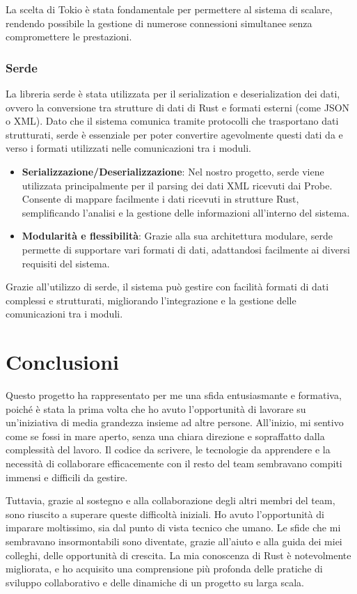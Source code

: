 \documentclass[target=bach,aauheader=,style=]{thud}
\begin{document}
La scelta di Tokio è stata fondamentale per permettere al sistema di scalare, rendendo possibile la gestione di numerose connessioni simultanee senza compromettere le prestazioni.

\subsection{Serde}
La libreria serde \cite{rust_serde} è stata utilizzata per il serialization e deserialization dei dati, ovvero la conversione tra strutture di dati di Rust e formati esterni (come JSON o XML). Dato che il sistema comunica tramite protocolli che trasportano dati strutturati, serde è essenziale per poter convertire agevolmente questi dati da e verso i formati utilizzati nelle comunicazioni tra i moduli.
\begin{itemize}
  \item \textbf{Serializzazione/Deserializzazione}: Nel nostro progetto, serde viene utilizzata principalmente per il parsing dei dati XML ricevuti dai Probe. Consente di mappare facilmente i dati ricevuti in strutture Rust, semplificando l'analisi e la gestione delle informazioni all'interno del sistema.
  \item \textbf{Modularità e flessibilità}: Grazie alla sua architettura modulare, serde permette di supportare vari formati di dati, adattandosi facilmente ai diversi requisiti del sistema.
\end{itemize}

Grazie all'utilizzo di serde, il sistema può gestire con facilità formati di dati complessi e strutturati, migliorando l'integrazione e la gestione delle comunicazioni tra i moduli.



\chapter{Conclusioni}
Questo progetto ha rappresentato per me una sfida entusiasmante e formativa, poiché è stata la prima volta che ho avuto l'opportunità di lavorare su un'iniziativa di media grandezza insieme ad altre persone. All'inizio, mi sentivo come se fossi in mare aperto, senza una chiara direzione e sopraffatto dalla complessità del lavoro. Il codice da scrivere, le tecnologie da apprendere e la necessità di collaborare efficacemente con il resto del team sembravano compiti immensi e difficili da gestire.

Tuttavia, grazie al sostegno e alla collaborazione degli altri membri del team, sono riuscito a superare queste difficoltà iniziali. Ho avuto l'opportunità di imparare moltissimo, sia dal punto di vista tecnico che umano. Le sfide che mi sembravano insormontabili sono diventate, grazie all'aiuto e alla guida dei miei colleghi, delle opportunità di crescita. La mia conoscenza di Rust è notevolmente migliorata, e ho acquisito una comprensione più profonda delle pratiche di sviluppo collaborativo e delle dinamiche di un progetto su larga scala.
\end{document}
